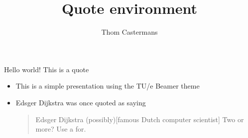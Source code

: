 \documentclass[12pt, aspectratio=169]{beamer} %
\title{Quote environment}
\author{Thom Castermans}
\begin{document}
\begin{frame}{Hello world! This is a quote}
  \begin{itemize}
    \item This is a simple presentation using the TU/e Beamer theme
    \item Edsger Dijkstra was once quoted as saying

      \begin{quote}{Edsger Dijkstra (possibly)}[famous Dutch computer scientist]
        Two or more? Use a for.
      \end{quote}
  \end{itemize}
\end{frame}
\end{document}
